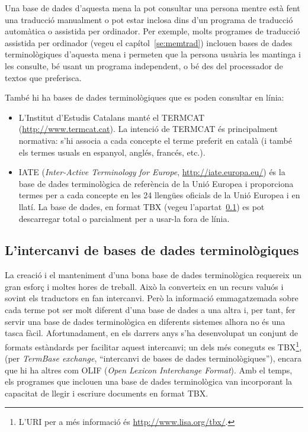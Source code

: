 Una base de dades d'aquesta mena la pot consultar una persona mentre
està fent una traducció manualment o pot estar inclosa dins d'un
programa de traducció automàtica o assistida per ordinador. Per
exemple, molts programes de traducció assistida per ordinador (vegeu
el capítol~\ref{se:memtrad}) inclouen bases de dades terminològiques
d'aquesta mena i permeten que la persona usuària les mantinga i les
consulte, bé usant un programa independent, o bé des del processador
de textos que preferisca. 

També hi ha bases de dades terminològiques que es poden consultar en
línia: 
\begin{itemize}
\item L'Institut d'Estudis Catalans manté el TERMCAT
(\url{http://www.termcat.cat}). La intenció de TERMCAT és principalment normativa: s'hi associa a cada concepte el terme preferit en català (i també els termes usuals en espanyol, anglés, francés, etc.).
\item IATE (\emph{Inter-Active Terminology for Europe},
  \url{http://iate.europa.eu/}) és la base de dades terminològica de
  referència de la Unió Europea i proporciona termes per a cada
  concepte en les 24 llengües oficials de la Unió Europea i en
  llatí. La base de dades, en format TBX (vegeu
  l'apartat~\ref{s3:tbx}) es pot descarregar total o parcialment per a
  usar-la fora de línia.
\end{itemize}

\subsection{L'intercanvi de bases de dades terminològiques}
\label{s3:tbx}

La creació i el manteniment d'una bona base de dades terminològica
requereix un gran esforç i moltes hores de treball. Això la converteix
en un recurs valuós i sovint els traductors en fan intercanvi. Però la
informació emmagatzemada sobre cada terme pot ser molt diferent d'una
base de dades a una altra i, per tant, fer servir una base de dades
terminològica en diferents sistemes alhora no és una tasca
fàcil. Afortunadament, en els darrers anys s'ha desenvolupat un
conjunt de formats estàndards per facilitar aquest intercanvi; un dels
més coneguts es TBX\footnote{L'URI per a més informació és
  \url{http://www.lisa.org/tbx/}.}, (per \emph{TermBase exchange},
``intercanvi de bases de dades terminològiques''), encara que hi ha
altres com OLIF (\emph{Open Lexicon Interchange Format}). Amb el
temps, els programes que inclouen una base de dades terminològica van
incorporant la capacitat de llegir i escriure documents en format TBX.

